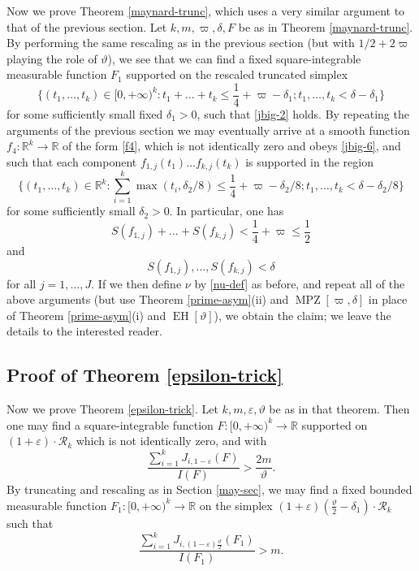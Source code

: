 \documentclass{bmcart}
\DeclareMathOperator*\EH{EH}
\DeclareMathOperator*\MPZ{MPZ}
\theoremstyle{plain}
\theoremstyle{definition}
\newcommand\R{\mathbb{R}}
\newcommand\eps{\varepsilon}
\begin{document}
Now we prove Theorem \ref{maynard-trunc}, which uses a very similar argument to that of the previous section.  Let $k, m, \varpi, \delta, F$ be as in Theorem \ref{maynard-trunc}.  By performing the same rescaling as in the previous section (but with $1/2 + 2\varpi$ playing the role of $\vartheta$), we see that we can find
a fixed square-integrable measurable function $F_1$ supported on the rescaled truncated simplex
$$ \{ (t_1,\dots,t_k) \in [0,+\infty)^k: t_1+\dots+t_k \leq \frac{1}{4} + \varpi - \delta_1; t_1,\dots,t_k < \delta - \delta_1 \}$$
for some sufficiently small fixed $\delta_1>0$, such that \eqref{jbig-2} holds.  By repeating the arguments of the previous section we may eventually arrive at a smooth function $f_4: \R^k \to \R$ of the form \eqref{f4}, which is not identically zero and obeys \eqref{jbig-6}, and such that each component $f_{1,j}(t_1) \dots f_{k,j}(t_k)$ is supported in the region
$$ \{ (t_1,\dots,t_k) \in \R^k: \sum_{i=1}^k \max(t_i, \delta_2/8) \leq \frac{1}{4}+\varpi - \delta_2/8; t_1,\dots,t_k < \delta - \delta_2/8 \}$$
for some sufficiently small $\delta_2>0$.  In particular, one has
$$
S(f_{1,j}) + \dots + S(f_{k,j}) < \frac{1}{4}+\varpi \leq \frac{1}{2}$$
and
$$ S(f_{1,j}),\dots,S(f_{k,j}) < \delta$$
for all $j=1,\dots,J$.   If we then define $\nu$ by \eqref{nu-def} as before, and repeat all of the above arguments (but use Theorem \ref{prime-asym}(ii) and $\MPZ[\varpi,\delta]$ in place of Theorem \ref{prime-asym}(i) and $\EH[\vartheta]$), we obtain the claim; we leave the details to the interested reader.

\subsection{Proof of Theorem \ref{epsilon-trick}}\label{trick-sec}

Now we prove Theorem \ref{epsilon-trick}. Let $k, m, \eps, \vartheta$ be as in that theorem.  Then one may find a square-integrable function $F: [0,+\infty)^k \to \R$ supported on $(1+\eps) \cdot {\mathcal R}_k$ which is not identically zero, and with
$$\frac{\sum_{i=1}^k J_{i,1-\eps}(F)}{I(F)} > \frac{2m}{\vartheta}.$$
By truncating and rescaling as in Section \ref{may-sec}, we may find a fixed bounded measurable function $F_1: [0,+\infty)^k \to \R$ on the simplex $(1+\eps) (\frac{\vartheta}{2}-\delta_1) \cdot {\mathcal R}_k$ such that 
$$\frac{\sum_{i=1}^k J_{i,(1-\eps) \frac{\vartheta}{2}}(F_1)}{I(F_1)} > m.$$
\end{document}
